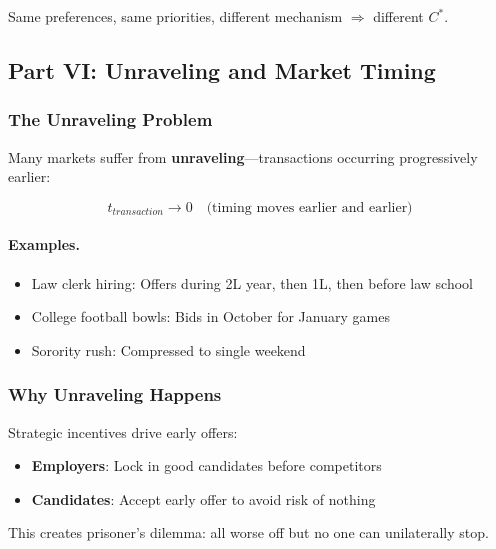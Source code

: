 Same preferences, same priorities, different mechanism $\Rightarrow$ different $C^*$.

\subsection{Part VI: Unraveling and Market Timing}

\subsubsection{The Unraveling Problem}

Many markets suffer from \textbf{unraveling}---transactions occurring 
progressively earlier:

\begin{equation}
\boxed{
t_{transaction} \to 0 \quad \text{(timing moves earlier and earlier)}
}
\label{eq:unraveling}
\end{equation}

\paragraph{Examples.}
\begin{itemize}
    \item Law clerk hiring: Offers during 2L year, then 1L, then before law school
    \item College football bowls: Bids in October for January games
    \item Sorority rush: Compressed to single weekend
\end{itemize}

\subsubsection{Why Unraveling Happens}

Strategic incentives drive early offers:
\begin{itemize}
    \item \textbf{Employers}: Lock in good candidates before competitors
    \item \textbf{Candidates}: Accept early offer to avoid risk of nothing
\end{itemize}

This creates prisoner's dilemma: all worse off but no one can unilaterally stop.


